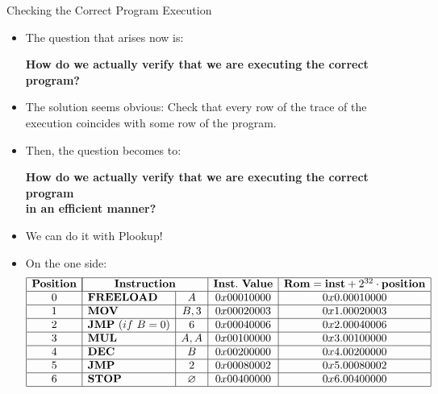 \begin{frame}[allowframebreaks]{Checking the Correct Program Execution}
\begin{itemize}
\item The question that arises now is:
\begin{center}
\textbf{How do we actually verify that we are executing the correct program?}
\end{center}

\item The solution seems obvious: Check that every row of the trace of the execution coincides with some row of the program.

\item Then, the question becomes to:
\begin{center}
\textbf{How do we actually verify that we are executing the correct program \\ in an efficient manner?}
\end{center}

\item We can do it with Plookup!

\framebreak

\item On the one side:
\[
\begin{array}{|c|l|c|c|c|}
\hline
\mathbf{Position} & \multicolumn{2}{|c|}{\mathbf{Instruction}} & \mathbf{Inst.~Value} & \mathbf{Rom} = \mathbf{inst} + 2^{32} \cdot \mathbf{position} \\ \hline
0 & \mathbf{FREELOAD} & A & 0x00010000 & 0x0.00010000 \\ \hline
1 & \mathbf{MOV} & B, 3 & 0x00020003 & 0x1.00020003 \\ \hline
2 & \mathbf{JMP}~(if~B = 0) & 6 & 0x00040006 & 0x2.00040006 \\ \hline
3 & \mathbf{MUL} & A, A & 0x00100000 & 0x3.00100000 \\ \hline
4 & \mathbf{DEC} & B & 0x00200000 & 0x4.00200000 \\ \hline
5 & \mathbf{JMP} & 2 & 0x00080002 & 0x5.00080002 \\ \hline
6 & \mathbf{STOP} & \emptyset & 0x00400000 & 0x6.00400000 \\ \hline
\end{array}
\]


\end{itemize}
\end{frame}
